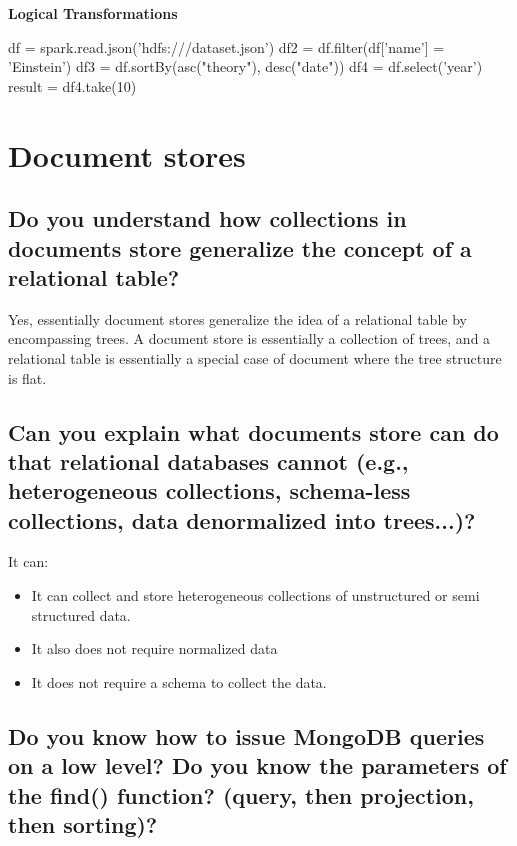 \documentclass{article}
\begin{document}
\textbf{Logical Transformations}

\begin{center}
\begin{listing}[H]
  \begin{python}
    df = spark.read.json('hdfs:///dataset.json') 
    df2 = df.filter(df['name'] = 'Einstein') 
    df3 = df.sortBy(asc("theory"), desc("date")) 
    df4 = df.select('year')
    result = df4.take(10)
  \end{python}
\end{listing}
\end{center}




\section{Document stores}
\subsection{Do you understand how collections in documents store generalize the concept of a relational table?}

Yes, essentially document stores generalize the idea of a relational table by encompassing trees. A document store is essentially a collection of trees, and a relational table is essentially a special case of document where the tree structure is flat.

\subsection{Can you explain what documents store can do that relational databases cannot (e.g., heterogeneous collections, schema-less collections, data denormalized into trees...)?}

It can:
\begin{itemize}
\item It can collect and store heterogeneous collections of unstructured or semi structured data.
\item It also does not require normalized data
\item It does not require a schema to collect the data.
\end{itemize}

\subsection{Do you know how to issue MongoDB queries on a low level? Do you know the parameters of the find() function? (query, then projection, then sorting)?}
\end{document}
